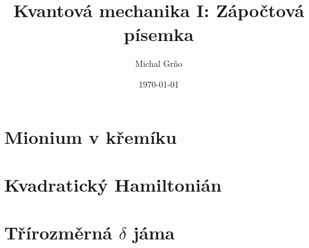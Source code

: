 \documentclass[10pt,a4paper]{article}
\begin{document}
\title{Kvantová mechanika I: Zápočtová písemka}
\author{Michal Grňo}
\date{\today}

\maketitle

\section{Mionium v křemíku}

\section{Kvadratický Hamiltonián}

\section{Třírozměrná \texorpdfstring{$\delta$}{δ} jáma}
\end{document}
